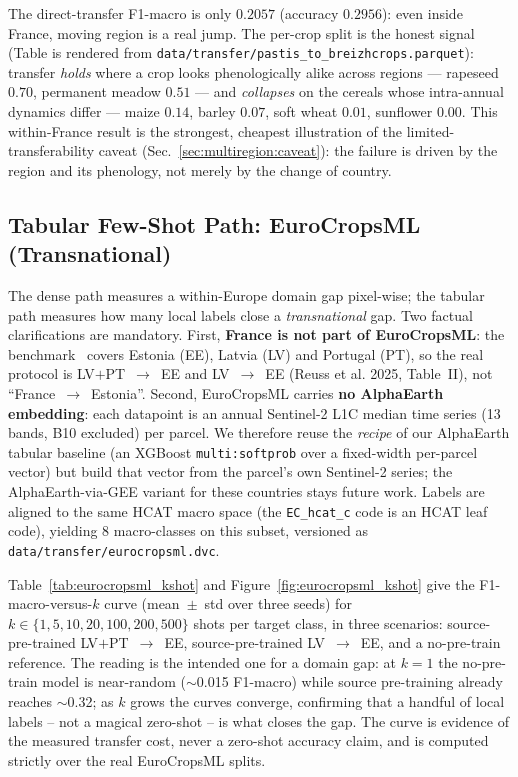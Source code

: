 The direct-transfer F1-macro is only $0.2057$ (accuracy $0.2956$): even inside France,
moving region is a real jump. The per-crop split is the honest signal (Table is rendered
from \texttt{data/transfer/pastis\_to\_breizhcrops.parquet}): transfer \emph{holds} where a
crop looks phenologically alike across regions --- rapeseed $0.70$, permanent meadow $0.51$
--- and \emph{collapses} on the cereals whose intra-annual dynamics differ --- maize $0.14$,
barley $0.07$, soft wheat $0.01$, sunflower $0.00$. This within-France result is the
strongest, cheapest illustration of the limited-transferability caveat
(Sec.~\ref{sec:multiregion:caveat}): the failure is driven by the region and its phenology,
not merely by the change of country.

\subsection{Tabular Few-Shot Path: EuroCropsML (Transnational)}
\label{sec:multiregion:fewshot}

The dense path measures a within-Europe domain gap pixel-wise; the tabular path measures
how many local labels close a \emph{transnational} gap. Two factual clarifications are
mandatory. First, \textbf{France is not part of EuroCropsML}: the benchmark~\cite{reuss2025eurocropsml} covers Estonia (EE), Latvia (LV) and Portugal (PT),
so the real protocol is LV$+$PT~$\rightarrow$~EE and LV~$\rightarrow$~EE (Reuss et al.
2025, Table~II), not ``France~$\rightarrow$~Estonia''.
Second, EuroCropsML carries \textbf{no AlphaEarth embedding}: each datapoint is an annual
Sentinel-2 L1C median time series (13 bands, B10 excluded) per parcel. We therefore reuse
the \emph{recipe} of our AlphaEarth tabular baseline (an XGBoost \texttt{multi:softprob}
over a fixed-width per-parcel vector) but build that vector from the parcel's own
Sentinel-2 series; the AlphaEarth-via-GEE variant for these countries stays future work.
Labels are aligned to the same HCAT macro space (the \texttt{EC\_hcat\_c} code is an HCAT
leaf code), yielding 8 macro-classes on this subset, versioned as
\texttt{data/transfer/eurocropsml.dvc}.

Table~\ref{tab:eurocropsml_kshot} and Figure~\ref{fig:eurocropsml_kshot} give the
F1-macro-versus-$k$ curve (mean~$\pm$~std over three seeds) for $k \in
\{1,5,10,20,100,200,500\}$ shots per target class, in three scenarios: source-pre-trained
LV$+$PT~$\rightarrow$~EE, source-pre-trained LV~$\rightarrow$~EE, and a no-pre-train
reference. The reading is the intended one for a domain gap: at $k{=}1$ the no-pre-train
model is near-random ($\sim$0.015 F1-macro) while source pre-training already reaches
$\sim$0.32; as $k$ grows the curves converge, confirming that a handful of local labels --
not a magical zero-shot -- is what closes the gap. The curve is evidence of the measured
transfer cost, never a zero-shot accuracy claim, and is computed strictly over the real
EuroCropsML splits.

